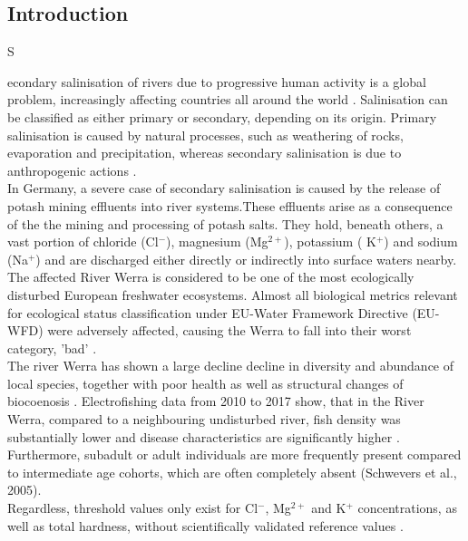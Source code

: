 \documentclass[twoside]{article}
\begin{document}
\begin{multicols}{2} %
\section{Introduction}
\lettrine[nindent=0em,lines=2]{S}{}

econdary salinisation of rivers due to progressive human activity is a global problem, increasingly affecting countries all around the world \citep{Arle2013,Canedo2013,Silva2000,Williams2001}. Salinisation can be classified as either primary or secondary, depending on its origin. Primary salinisation is caused by natural processes, such as weathering of rocks, evaporation and precipitation, whereas secondary salinisation is due to anthropogenic actions \citep{Canedo2012}.\\
In Germany, a severe case of secondary salinisation is caused by the release of potash mining effluents into river systems.These effluents arise as a consequence of the the mining and processing of potash salts. They hold, beneath others, a vast portion of chloride (Cl$^-$),  magnesium (Mg$^{2+}$), potassium ( K$^+$) and sodium (Na$^+$) and are discharged either directly or indirectly into surface waters nearby.  \\
The affected River Werra is considered to be one of the most ecologically disturbed European freshwater ecosystems. Almost all biological metrics relevant for ecological status classification under EU-Water Framework Directive (EU-WFD) were adversely affected, causing the Werra to fall into their worst category, 'bad' \citep{Arle2013}.  \\

The river Werra has shown a large decline decline in diversity and abundance of local species, together with poor health as well as structural changes of biocoenosis  \citep{Arle2013,hubner2007}. Electrofishing data from 2010 to 2017 show, that in the River Werra, compared to a neighbouring undisturbed river, fish density was substantially lower and disease characteristics are significantly higher \citep{Laves2017}.  Furthermore, subadult or adult individuals are more frequently present compared to intermediate age cohorts, which are often completely absent (Schwevers et al., 2005). 
\\
Regardless, threshold values only exist for Cl$^-$, Mg$^{2+}$ and K$^+$ concentrations, as well as total hardness, without scientifically validated reference values \citep{hubner2006}.\\ \\


\end{multicols}
\end{document}

